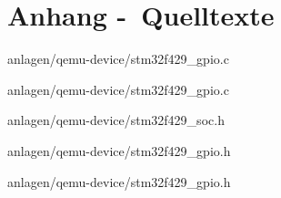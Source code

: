 
\clearpage
\chapter{Anhang -\ Quelltexte}

\begin{minipage}{\linewidth}

                {anlagen/qemu-device/stm32f429_gpio.c}
\end{minipage}

\begin{minipage}{\linewidth}

                {anlagen/qemu-device/stm32f429_gpio.c}
\end{minipage}


                {anlagen/qemu-device/stm32f429_soc.h}


                {anlagen/qemu-device/stm32f429_gpio.h}


                {anlagen/qemu-device/stm32f429_gpio.h}
